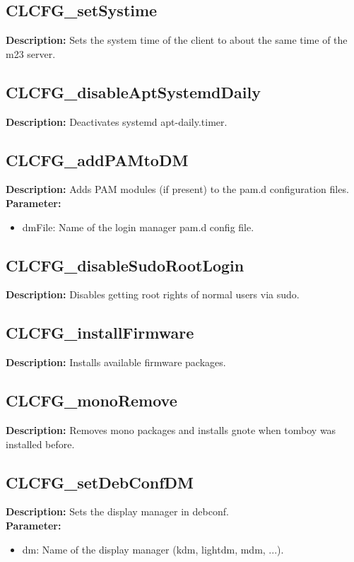\subsection{CLCFG\_setSystime}
\textbf{Description:} Sets the system time of the client to about the same time of the m23 server.\\

\subsection{CLCFG\_disableAptSystemdDaily}
\textbf{Description:} Deactivates systemd apt-daily.timer.\\

\subsection{CLCFG\_addPAMtoDM}
\textbf{Description:} Adds PAM modules (if present) to the pam.d configuration files.\\
\textbf{Parameter:}
\begin{itemize}
\item dmFile: Name of the login manager pam.d config file.
\end{itemize}

\subsection{CLCFG\_disableSudoRootLogin}
\textbf{Description:} Disables getting root rights of normal users via sudo.\\

\subsection{CLCFG\_installFirmware}
\textbf{Description:} Installs available firmware packages.\\

\subsection{CLCFG\_monoRemove}
\textbf{Description:} Removes mono packages and installs gnote when tomboy was installed before.\\

\subsection{CLCFG\_setDebConfDM}
\textbf{Description:} Sets the display manager in debconf.\\
\textbf{Parameter:}
\begin{itemize}
\item dm: Name of the display manager (kdm, lightdm, mdm, ...).
\end{itemize}

